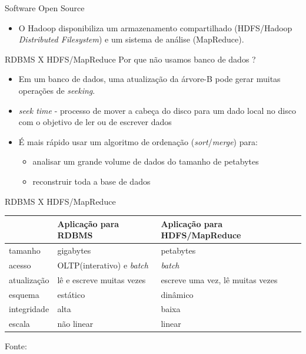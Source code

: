 \begin{frame}{Software Open Source}
     \begin{itemize}
        \item<1-> O Hadoop disponibiliza um armazenamento compartilhado (HDFS/Hadoop \emph{Distributed Filesystem}) e um sistema de análise (MapReduce).
     \end{itemize}
  \end{frame}

  \begin{frame}{RDBMS X HDFS/MapReduce}
    Por que não usamos banco de dados ?
     \begin{itemize}
        \item<1->  Em um banco de dados, uma atualização da árvore-B pode gerar muitas operações de \emph{seeking}.
        \item<2->  \emph{seek time} - processo de mover a cabeça do disco para um dado local no disco com o objetivo de ler ou de escrever dados
        \item<3->  É mais rápido usar um algoritmo de ordenação (\emph{sort}/\emph{merge}) para:
          \begin{itemize}
             \item<4-> analisar um grande volume de dados do tamanho de petabytes
             \item<5-> reconstruir toda a base de dados
          \end{itemize}
      \end{itemize}
  \end{frame}

  \begin{frame}{RDBMS X HDFS/MapReduce}
{\small
        \begin{center}
          \begin{tabular}{|p{2cm}||p{3.5cm}||p{3.5cm}|}
            \hline
& Aplicação para RDBMS & Aplicação para HDFS/MapReduce\\ \hline
tamanho & gigabytes & petabytes\\ \hline
acesso & OLTP(interativo) e \emph{batch} & \emph{batch}\\ \hline
atualização & lê e escreve muitas vezes & escreve uma vez, lê muitas vezes\\ \hline
esquema & estático & dinâmico\\ \hline
integridade & alta & baixa\\ \hline
escala & não linear & linear\\ \hline
          \end{tabular}
        \end{center}
}

Fonte: \cite{White:2009}
  \end{frame}

